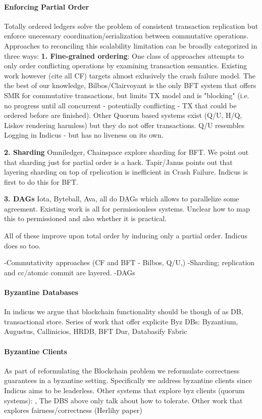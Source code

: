 \paragraph{Enforcing Partial Order}
Totally ordered ledgers solve the problem of consistent transaction replication but enforce unecessary coordination/serialization between commutative operations. 
Approaches to reconciling this scalability limitation can be broadly categorized in three ways:
\textbf{1. Fine-grained ordering}: One class of approaches attempts to only order conflicting operations by examining transaction semantics. Existing work however (cite all CF) targets almost exlusively the crash failure model. The the best of our knowledge, Bilbos/Clairvoyant is the only BFT system that offers SMR for commutative transactions, but limits TX model and is "blocking" (i.e. no progress until all concurrent - potentially conflicting - TX that could be ordered before are finished). Other Quorum based systems exist (Q/U, H/Q, Liskov rendering harmless) but they do not offer transactions. Q/U resembles Logging in Indicus - but has no liveness on its own.

\textbf{2. Sharding} Omniledger, Chainspace explore sharding for BFT. We point out that sharding just for partial order is a hack.
Tapir/Janus points out that layering sharding on top of rpelication is inefficient in Crash Failure. Indicus is first to do this for BFT.

\textbf{3. DAGs} Iota, Byteball, Ava, all do DAGs which allows to parallelize some agreement. Existing work is all for permissionless systems. Unclear how to map this to permissioned and also whether it is practical.

All of these improve upon total order by inducing only a partial order. Indicus does so too.

-Commutativity approaches (CF and BFT - Bilbos, Q/U,)
-Sharding; replication and cc/atomic commit are layered. 
-DAGs

\paragraph{Byzantine Databases}
In indicus we argue that blockchain functionality should be though of as DB, transactional store. 
Series of work that offer explicite Byz DBs: Byzantium, Augustus, Callinicios, HRDB, BFT Dur,
Databasify Fabric


\paragraph{Byzantine Clients}
As part of reformulating the Blockchain problem we reformulate correctness guarantees in a byzantine setting. Specifically we address byzantine clients since Indicus aims to be leaderless. Other systems that explore byz clients (quorum systems): \cite{Liskov06Tolerating}, The DBS above only talk about how to tolerate.
Other work that explores fairness/correctness (Herlihy paper)


